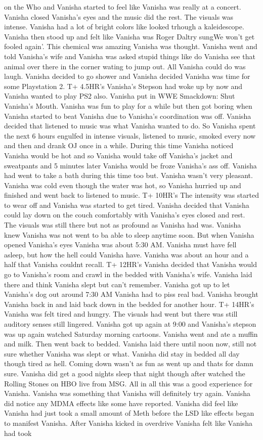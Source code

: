 \documentclass[12pt]{book}
\begin{document}
on the Who and Vanisha started to feel like Vanisha was really at a concert. Vanisha closed Vanisha's eyes and the music did the rest. The visuals was intense. Vanisha had a lot of bright colors like looked trhough a kaleidescope. Vanisha then stood up and felt like Vanisha was Roger Daltry sungWe won't get fooled again'. This chemical was amazing Vanisha was thought. Vanisha went and told Vanisha's wife and Vanisha was asked stupid things like do Vanisha see that animal over there in the corner wating to jump out. All Vanisha could do was laugh. Vanisha decided to go shower and Vanisha decided Vanisha was time for some Playstation 2. T+ 4.5HR's Vanisha's Stepson had woke up by now and Vanisha wanted to play PS2 also. Vanisha put in WWE Smackdown: Shut Vanisha's Mouth. Vanisha was fun to play for a while but then got boring when Vanisha started to beat Vanisha due to Vanisha's coordination was off. Vanisha decided that listened to music was what Vanisha wanted to do. So Vanisha spent the next 6 hours engulfed in intense visuals, listened to music, smoked every now and then and drank OJ once in a while. During this time Vanisha noticed Vanisha would be hot and so Vanisha would take off Vanisha's jacket and sweatpants and 5 minutes later Vanisha would be froze Vanisha's ass off. Vanisha had went to take a bath during this time too but. Vanisha wasn't very pleasant. Vanisha was cold even though the water was hot, so Vanisha hurried up and finished and went back to listened to music. T+ 10HR's The intensity was started to wear off and Vanisha was started to get tired. Vanisha decided that Vanisha could lay down on the couch comfortably with Vanisha's eyes closed and rest. The visuals was still there but not as profound as Vanisha had was. Vanisha knew Vanisha was not went to ba able to sleep anytime soon. But when Vanisha opened Vanisha's eyes Vanisha was about 5:30 AM. Vanisha must have fell asleep, but how the hell could Vanisha have. Vanisha was about an hour and a half that Vanisha couldnt recall. T+ 12HR's Vanisha decided that Vanisha would go to Vanisha's room and crawl in the bedded with Vanisha's wife. Vanisha laid there and think Vanisha slept but can't remember. Vanisha got up to let Vanisha's dog out around 7:30 AM Vanisha had to piss real bad. Vanisha brought Vanisha back in and laid back down in the bedded for another hour. T+ 14HR's Vanisha was felt tired and hungry. The visuals had went but there was still auditory senses still lingered. Vanisha got up again at 9:00 and Vanisha's stepson was up again watched Saturday morning cartoons. Vanisha went and ate a muffin and milk. Then went back to bedded. Vanisha laid there until noon now, still not sure whether Vanisha was slept or what. Vanisha did stay in bedded all day though tired as hell. Coming down wasn't as fun as went up and thats for damn sure. Vanisha did get a good nights sleep that night though after watched the Rolling Stones on HBO live from MSG. All in all this was a good experience for Vanisha. Vanisha was something that Vanisha will definitely try again. Vanisha did notice any MDMA effects like some have reported. Vanisha did feel like Vanisha had just took a small amount of Meth before the LSD like effects began to manifest Vanisha. After Vanisha kicked in overdrive Vanisha felt like Vanisha had took 
\end{document}
